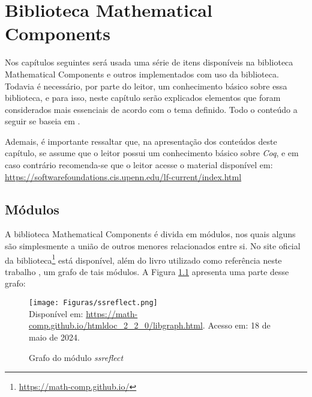 \chapter{Biblioteca Mathematical Components}
\label{cap:mathcomp}

Nos capítulos seguintes será usada uma série de itens disponíveis na biblioteca Mathematical Components e outros implementados com uso da biblioteca. Todavia é necessário, por parte do leitor, um conhecimento básico sobre essa biblioteca, e para isso, neste capítulo serão explicados elementos que foram considerados mais essenciais de acordo com o tema definido. Todo o conteúdo a seguir se baseia em \cite{assia_mahboubi_2022_7118596}.

Ademais, é importante ressaltar que, na apresentação dos conteúdos deste capítulo, se assume que o leitor possui um conhecimento básico sobre \textit{Coq}, e em caso contrário recomenda-se que o leitor acesse o material disponível em: \url{https://softwarefoundations.cis.upenn.edu/lf-current/index.html}

\section{Módulos}
A biblioteca Mathematical Components é divida em módulos, nos quais alguns são simplesmente a união de outros menores relacionados entre si. No site oficial da biblioteca\footnote{\url{https://math-comp.github.io/}} está disponível, além do livro utilizado como referência neste trabalho \cite{assia_mahboubi_2022_7118596}, um grafo
de tais módulos. A Figura \ref{fig:graph-mathcomp} apresenta uma parte desse grafo:

\begin{figure}[h]
    \centering
    \caption{Grafo do módulo \textit{ssreflect}}
    \texttt{[image: Figuras/ssreflect.png]}\\
    \footnotesize{Disponível em: \url{https://math-comp.github.io/htmldoc_2_2_0/libgraph.html}.
    Acesso em: 18 de maio de 2024.}
    \label{fig:graph-mathcomp}
\end{figure}


